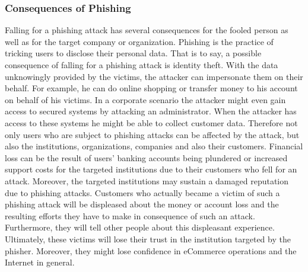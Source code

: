 \subsubsection{Consequences of Phishing}
Falling for a phishing attack has several consequences for the fooled person as well as for the target company or organization. Phishing is the practice of tricking users to disclose their personal data. That is to say, a possible consequence of falling for a phishing attack is identity theft. With the data unknowingly provided by the victims, the attacker can impersonate them on their behalf. For example, he can do online shopping or transfer money to his account on behalf of his victims. In a corporate scenario the attacker might even gain access to secured systems by attacking an administrator. When the attacker has access to these systems he might be able to collect customer data. Therefore not only users who are subject to phishing attacks can be affected by the attack, but also the institutions, organizations, companies and also their customers. Financial loss can be the result of users' banking accounts being plundered or increased support costs for the targeted institutions due to their customers who fell for an attack. Moreover, the targeted institutions may sustain a damaged reputation due to phishing attacks. Customers who actually became a victim of such a phishing attack will be displeased about the money or account loss and the resulting efforts they have to make in consequence of such an attack. Furthermore, they will tell other people about this displeasant experience. Ultimately, these victims will lose their trust in the institution targeted by the phisher. Moreover, they might lose confidence in eCommerce operations and the Internet in general.

